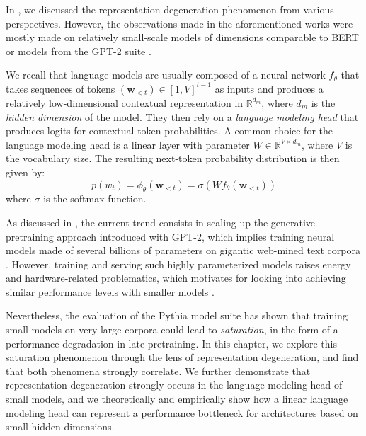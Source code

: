 In , we discussed the representation degeneration phenomenon from various perspectives. However, the observations made in the aforementioned works were mostly made on relatively small-scale models of dimensions comparable to BERT \citep{devlin-etal-2019-bert} or models from the GPT-2 suite \citep{gpt2}.

We recall that language models are usually composed of a neural network $f_\theta$ that takes sequences of tokens $(\mathbf{w}_{<t}) \in [1,V]^{t-1}$ as inputs and produces a relatively low-dimensional contextual representation in $\mathbb{R}^{d_m}$, where $d_m$ is the \textit{hidden dimension} of the model. They then rely on a \textit{language modeling head} that produces logits for contextual token probabilities. A common choice for the language modeling head is a linear layer with parameter $W \in \mathbb{R}^{V \times d_m}$, where $V$ is the vocabulary size. The resulting next-token probability distribution is then given by:
$$
p(w_t) = \phi_\theta(\mathbf{w}_{<t}) = \sigma (W f_\theta(\mathbf{w}_{<t}))
$$
where $\sigma$ is the softmax function.

As discussed in , the current trend consists in scaling up the generative pretraining approach introduced with GPT-2, which implies training neural models made of several billions of parameters on gigantic web-mined text corpora \citep{brown2020language, touvron2023llama, almazrouei2023falcon, jiang2023mistral}. However, training and serving such highly parameterized models raises energy and hardware-related problematics, which motivates for looking into achieving similar performance levels with smaller models \citep{beyond_chinchilla}.

Nevertheless, the evaluation of the Pythia model suite \citep{biderman2023pythia} has shown that training small models on very large corpora could lead to \textit{saturation}, in the form of a performance degradation in late pretraining. In this chapter, we explore this saturation phenomenon through the lens of representation degeneration, and find that both phenomena strongly correlate. We further demonstrate that representation degeneration strongly occurs in the language modeling head of small models, and we theoretically and empirically show how a linear language modeling head can represent a performance bottleneck for architectures based on small hidden dimensions.

